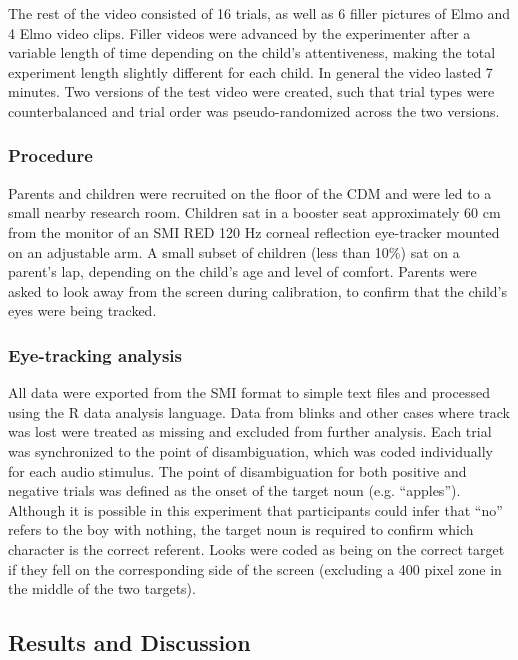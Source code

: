 \documentclass[man]{apa2}
\begin{document}
The rest of the video consisted of 16 trials, as well as 6 filler pictures of Elmo and 4 Elmo video clips.  Filler videos were advanced by the experimenter after a variable length of time depending on the child's attentiveness, making the total experiment length slightly different for each child. In general the video lasted 7 minutes.  Two versions of the test video were created, such that trial types were counterbalanced and trial order was pseudo-randomized across the two versions. 

\subsubsection{Procedure}

Parents and children were recruited on the floor of the CDM and were led to a small nearby research room.  Children sat in a booster seat approximately 60 cm from the monitor of an SMI RED 120 Hz corneal reflection eye-tracker mounted on an adjustable arm.  A small subset of children  (less than 10\%) sat on a parent's lap, depending on the child's age and level of comfort.  Parents were asked to look away from the screen during calibration, to confirm that the child's eyes were being tracked.  

\subsubsection{Eye-tracking analysis}

All data were exported from the SMI format to simple text files and processed using the R data analysis language. Data from blinks and other cases where track was lost were treated as missing and excluded from further analysis. Each trial was synchronized to the point of disambiguation, which was coded individually for each audio stimulus. The point of disambiguation for both positive and negative trials was defined as the onset of the target noun (e.g. ``apples'').  Although it is possible in this experiment that participants could infer that ``no'' refers to the boy with nothing, the target noun is required to confirm which character is the correct referent. Looks were coded as being on the correct target if they fell on the corresponding side of the screen (excluding a  400 pixel zone in the middle of the two targets).  

\subsection{Results and Discussion}
\end{document}
